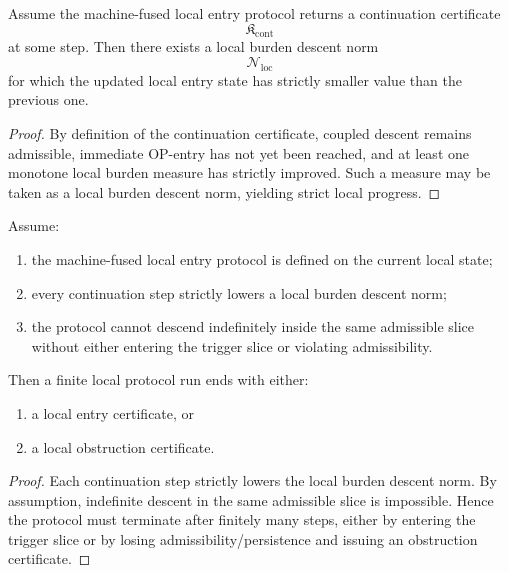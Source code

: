 \begin{proposition}
\label{prop:continuation-implies-local-progress}
Assume the machine-fused local entry protocol returns a continuation certificate
\[
\mathfrak{K}_{\mathrm{cont}}
\]
at some step.
Then there exists a local burden descent norm
\[
\mathcal{N}_{\mathrm{loc}}
\]
for which the updated local entry state has strictly smaller value than the previous one.
\end{proposition}

\begin{proof}
By definition of the continuation certificate, coupled descent remains admissible, immediate OP-entry has not yet been reached, and at least one monotone local burden measure has strictly improved.
Such a measure may be taken as a local burden descent norm, yielding strict local progress.
\end{proof}

\begin{lemma}
\label{lem:finite-local-entry-or-obstruction-lemma}
Assume:
\begin{enumerate}
 \item the machine-fused local entry protocol is defined on the current local state;
 \item every continuation step strictly lowers a local burden descent norm;
 \item the protocol cannot descend indefinitely inside the same admissible slice without either entering the trigger slice or violating admissibility.
\end{enumerate}
Then a finite local protocol run ends with either:
\begin{enumerate}
 \item a local entry certificate, or
 \item a local obstruction certificate.
\end{enumerate}
\end{lemma}

\begin{proof}
Each continuation step strictly lowers the local burden descent norm.
By assumption, indefinite descent in the same admissible slice is impossible.
Hence the protocol must terminate after finitely many steps, either by entering the trigger slice or by losing admissibility/persistence and issuing an obstruction certificate.
\end{proof}

